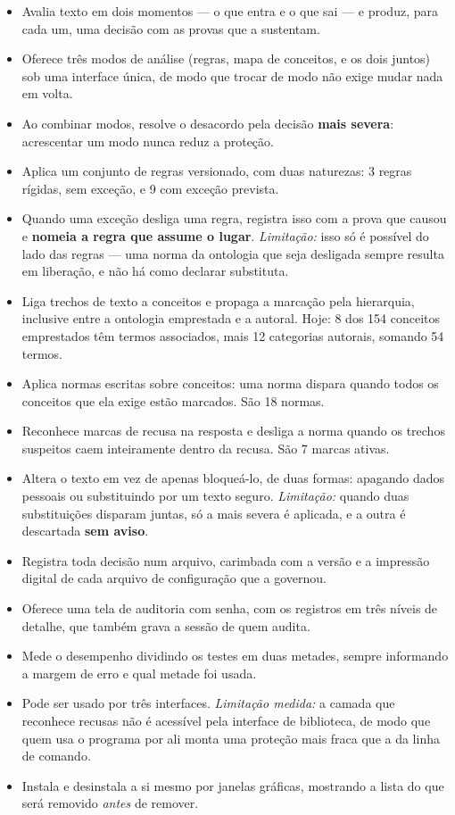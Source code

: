 \documentclass[10pt]{article}
\begin{document}
\begin{itemize}\itemsep0pt
\item[\textbf{RF1}] Avalia texto em dois momentos --- o que entra e o que sai --- e produz, para cada um, uma decisão com as provas que a sustentam.
\item[\textbf{RF2}] Oferece três modos de análise (regras, mapa de conceitos, e os dois juntos) sob uma interface única, de modo que trocar de modo não exige mudar nada em volta.
\item[\textbf{RF3}] Ao combinar modos, resolve o desacordo pela decisão \textbf{mais severa}: acrescentar um modo nunca reduz a proteção.
\item[\textbf{RF4}] Aplica um conjunto de regras versionado, com duas naturezas: 3 regras rígidas, sem exceção, e 9 com exceção prevista.
\item[\textbf{RF5}] Quando uma exceção desliga uma regra, registra isso com a prova que causou e \textbf{nomeia a regra que assume o lugar}. \emph{Limitação:} isso só é possível do lado das regras --- uma norma da ontologia que seja desligada sempre resulta em liberação, e não há como declarar substituta.
\item[\textbf{RF6}] Liga trechos de texto a conceitos e propaga a marcação pela hierarquia, inclusive entre a ontologia emprestada e a autoral. Hoje: 8 dos 154 conceitos emprestados têm termos associados, mais 12 categorias autorais, somando 54 termos.
\item[\textbf{RF7}] Aplica normas escritas sobre conceitos: uma norma dispara quando todos os conceitos que ela exige estão marcados. São 18 normas.
\item[\textbf{RF8}] Reconhece marcas de recusa na resposta e desliga a norma quando os trechos suspeitos caem inteiramente dentro da recusa. São 7 marcas ativas.
\item[\textbf{RF9}] Altera o texto em vez de apenas bloqueá-lo, de duas formas: apagando dados pessoais ou substituindo por um texto seguro. \emph{Limitação:} quando duas substituições disparam juntas, só a mais severa é aplicada, e a outra é descartada \textbf{sem aviso}.
\item[\textbf{RF10}] Registra toda decisão num arquivo, carimbada com a versão e a impressão digital de cada arquivo de configuração que a governou.
\item[\textbf{RF11}] Oferece uma tela de auditoria com senha, com os registros em três níveis de detalhe, que também grava a sessão de quem audita.
\item[\textbf{RF12}] Mede o desempenho dividindo os testes em duas metades, sempre informando a margem de erro e qual metade foi usada.
\item[\textbf{RF13}] Pode ser usado por três interfaces. \emph{Limitação medida:} a camada que reconhece recusas não é acessível pela interface de biblioteca, de modo que quem usa o programa por ali monta uma proteção mais fraca que a da linha de comando.
\item[\textbf{RF14}] Instala e desinstala a si mesmo por janelas gráficas, mostrando a lista do que será removido \emph{antes} de remover.
\end{itemize}
\end{document}
